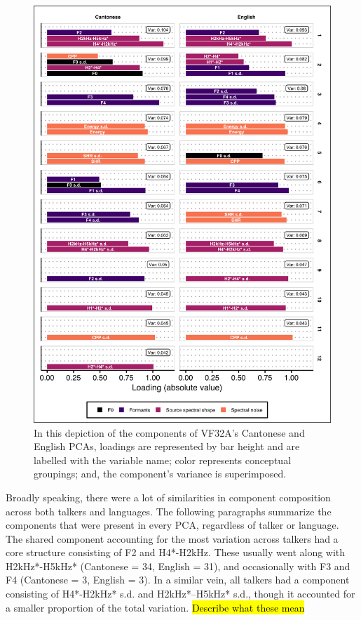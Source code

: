\begin{figure}[htbp]
\begin{center}
\includegraphics[width=0.875\linewidth]{figures/ch3_pca_vf32a_vert5in.png} 
\caption{In this depiction of the components of VF32A's Cantonese and English PCAs, loadings are represented by bar height and are labelled with the variable name; color represents conceptual groupings; and, the component's variance is superimposed.}
\label{ch3:fig:VF32A}
\end{center}
\end{figure}

Broadly speaking, there were a lot of similarities in component composition across both talkers and languages. The following paragraphs summarize the components that were present in every PCA, regardless of talker or language. The shared component accounting for the most variation across talkers had a core structure consisting of F2 and H4*-H2kHz. These usually went along with H2kHz*-H5kHz* (Cantonese = 34, English = 31), and occasionally with F3 and F4 (Cantonese = 3, English = 3). In a similar vein, all talkers had a component consisting of H4*-H2kHz* s.d. and H2kHz*--H5kHz* s.d., though it accounted for a smaller proportion of the total variation. \hl{Describe what these mean}

